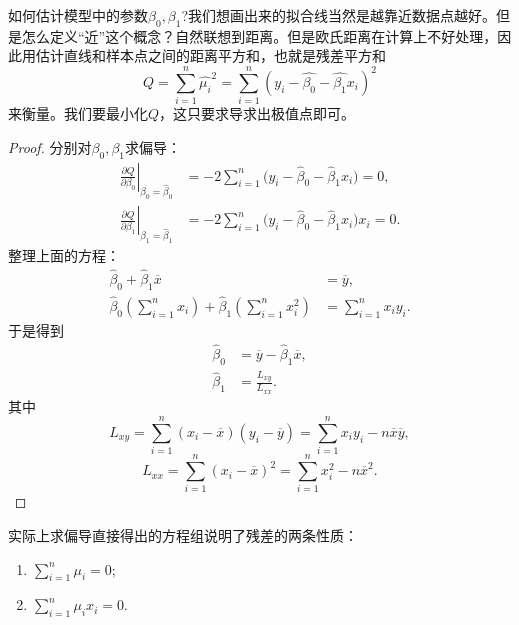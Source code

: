 \documentclass[lang=cn,10pt]{elegantbook}
\begin{document}
    如何估计模型中的参数\(\beta_0,\beta_1\)?我们想画出来的拟合线当然是越靠近数据点越好。但是怎么定义“近”这个概念？自然联想到距离。但是欧氏距离在计算上不好处理，因此用估计直线和样本点之间的距离平方和，也就是残差平方和
    \[Q=\sum_{i=1}^{n}\hat{\mu_i}^2=\sum_{i=1}^{n}(y_i-\hat{\beta_0}-\hat{\beta_1}x_i)^2\]
    来衡量。我们要最小化\(Q\)，这只要求导求出极值点即可。
    \begin{proof}
        分别对\({\beta_0},{\beta_1}\)求偏导：
        \begin{align*}
        \left.\frac{\partial Q}{\partial\beta_0}\right|_{\beta_0=\hat{\beta}_0}
        &= -2\sum_{i=1}^{n}\bigl(y_i-\hat{\beta}_0-\hat{\beta}_1 x_i\bigr) = 0,\\
        \left.\frac{\partial Q}{\partial\beta_1}\right|_{\beta_1=\hat{\beta}_1}
        &= -2\sum_{i=1}^{n}\bigl(y_i-\hat{\beta}_0-\hat{\beta}_1 x_i\bigr)x_i = 0.
        \end{align*}
        整理上面的方程：
        \begin{align*}
            \hat{\beta}_0+\hat{\beta}_1\overline{x}&=\overline{y},\\
            \hat{\beta}_0(\sum_{i=1}^{n}x_i)+\hat{\beta}_1(\sum_{i=1}^{n}x_i^2)&=\sum_{i=1}^{n}x_iy_i.
        \end{align*}
        于是得到
        \begin{align*}
            \hat{\beta}_0&=\overline{y}-\hat{\beta}_1\overline{x},\\
            \hat{\beta}_1&=\frac{L_{xy}}{L_{xx}}.
        \end{align*}
        其中
        \[L_{xy}=\sum_{i=1}^{n}(x_i-\overline{x})(y_i-\overline{y})=\sum_{i=1}^{n}x_iy_i-n\overline{x}\overline{y},\]
        \[L_{xx}=\sum_{i=1}^{n}(x_i-\overline{x})^2=\sum_{i=1}^{n}x_i^2-n\overline{x}^2.\]
    \end{proof}
    \begin{note}
    实际上求偏导直接得出的方程组说明了残差的两条性质：
    \begin{enumerate}
        \item \(\sum_{i=1}^{n}\mu_i=0\);
        \item \(\sum_{i=1}^{n}\mu_ix_i=0\).
    \end{enumerate}
    \end{note}
\end{document}
